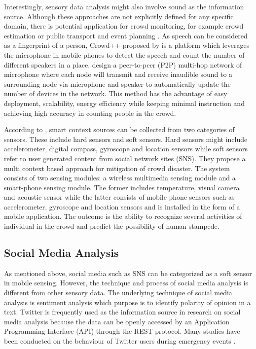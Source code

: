 Interestingly, sensory data analysis might also involve sound as the information source. Although these approaches are not explicitly defined for any specific domain, there is potential application for crowd monitoring, for example crowd estimation \citep{Xu2013} or public transport and event planning \citep{Kannan2012}. As speech can be considered as a fingerprint of a person, Crowd++ proposed by \citet{Xu2013} is a platform which leverages the microphone in mobile phones to detect the speech and count the number of different speakers in a place. \citet{Kannan2012} design a peer-to-peer (P2P) multi-hop network of microphone where each node will transmit and receive inaudible sound to a surrounding node via microphone and speaker to automatically update the number of devices in the network. This method has the advantage of easy deployment, scalability, energy efficiency while keeping minimal instruction and achieving high accuracy in counting people in the crowd.

According to \citet{Ramesh2014}, smart context sources can be collected from two categories of sensors. These include hard sensors and soft sensors. Hard sensors might include accelerometer, digital compass, gyroscope and location sensors while soft sensors refer to user generated content from social network sites (SNS). They propose a multi context based approach for mitigation of crowd disaster. The system consists of two sensing modules: a wireless multimedia sensing module and a smart-phone sensing module. The former includes temperature, visual camera and acoustic sensor while the latter consists of mobile phone sensors such as accelerometer, gyroscope and location sensors and is installed in the form of a mobile application. The outcome is the ability to recognize several activities of individual in the crowd and predict the possibility of human stampede.

\subsection{Social Media Analysis}
As mentioned above, social media such as SNS can be categorized as a soft sensor in mobile sensing. However, the technique and process of social media analysis is different from other sensory data. The underlying technique of social media analysis is sentiment analysis which purpose is to identify polarity of opinion in a text. Twitter is frequently used as the information source in research on social media analysis because the data can be openly accessed by an Application Programming Interface (API) through the REST protocol. Many studies have been conducted on the behaviour of Twitter users during emergency events \citep{Hughes2009,Sakaki2010,Vieweg2010,Yin2012}.

